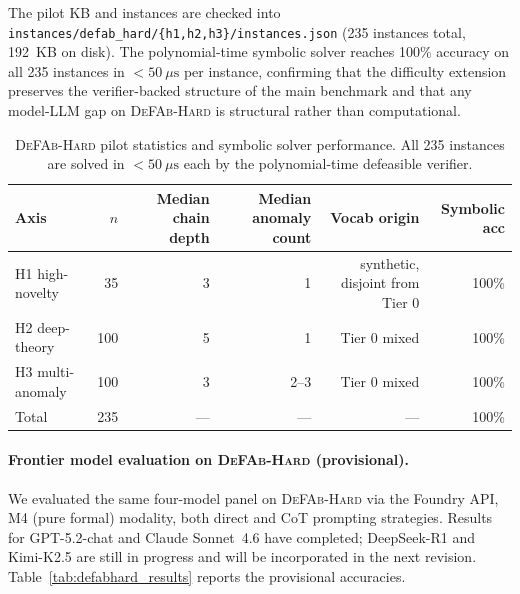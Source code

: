 \documentclass{article}
\theoremstyle{definition}
\begin{document}
The pilot KB and instances are checked into \texttt{instances/defab\_hard/\{h1,h2,h3\}/instances.json} (235 instances total, 192~KB on disk). The polynomial-time symbolic solver reaches 100\% accuracy on all 235 instances in $<50~\mu\mathrm{s}$ per instance, confirming that the difficulty extension preserves the verifier-backed structure of the main benchmark and that any model-LLM gap on \textsc{DeFAb-Hard} is structural rather than computational.

\begin{table}[h]
\centering
\caption{\textsc{DeFAb-Hard} pilot statistics and symbolic solver performance. All 235 instances are solved in $<50~\mu\mathrm{s}$ each by the polynomial-time defeasible verifier.}
\label{tab:defabhard}
\small
\begin{tabular}{@{}lrrrrr@{}}
\toprule
\textbf{Axis} & $n$ & Median chain depth & Median anomaly count & Vocab origin & Symbolic acc \\
\midrule
H1 high-novelty   & \phantom{0}35 & 3 & 1 & synthetic, disjoint from Tier 0 & 100\% \\
H2 deep-theory    & 100 & 5 & 1 & Tier 0 mixed & 100\% \\
H3 multi-anomaly  & 100 & 3 & 2--3 & Tier 0 mixed & 100\% \\
\midrule
Total             & 235 & --- & --- & --- & 100\% \\
\bottomrule
\end{tabular}
\end{table}

\paragraph{Frontier model evaluation on \textsc{DeFAb-Hard} (provisional).}
We evaluated the same four-model panel on \textsc{DeFAb-Hard} via the Foundry API, M4 (pure formal) modality, both direct and CoT prompting strategies. Results for GPT-5.2-chat and Claude Sonnet~4.6 have completed; DeepSeek-R1 and Kimi-K2.5 are still in progress and will be incorporated in the next revision. Table~\ref{tab:defabhard_results} reports the provisional accuracies.
\end{document}
